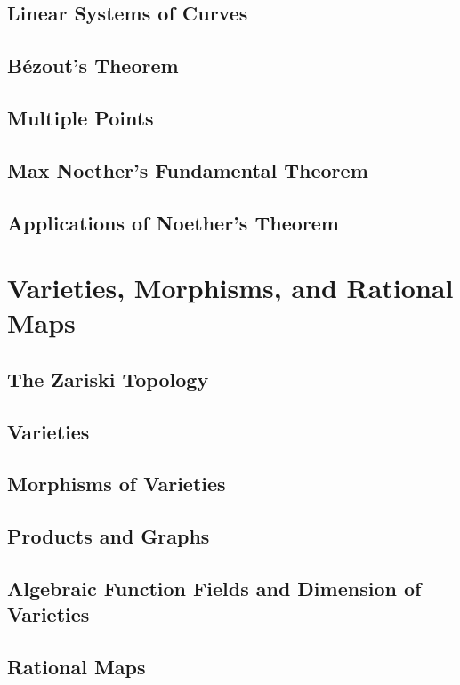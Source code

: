 \documentclass[oneside]{amsbook}
\numberwithin{prob}{chapter}
\begin{document}
\section{Linear Systems of Curves}

\section{Bézout's Theorem}

\section{Multiple Points}

\section{Max Noether's Fundamental Theorem}

\section{Applications of Noether's Theorem}


\chapter{Varieties, Morphisms, and Rational Maps}
\section{The Zariski Topology}

\section{Varieties}

\section{Morphisms of Varieties}

\section{Products and Graphs}

\section{Algebraic Function Fields and Dimension of Varieties}

\section{Rational Maps}

\end{document}
